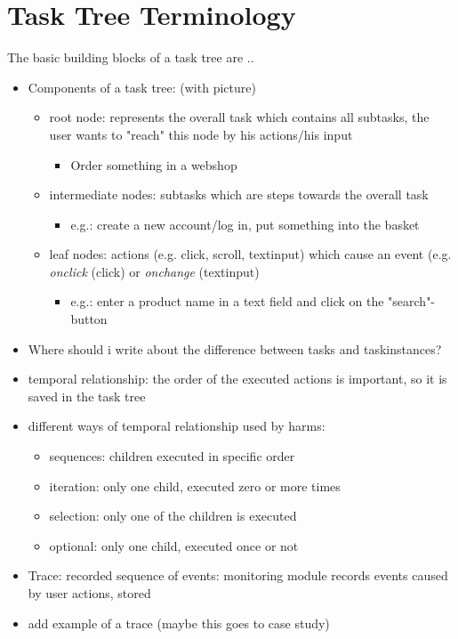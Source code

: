 \section{Task Tree Terminology}
\label{sec:foundationtasktreeterminology}
	The basic building blocks of a task tree are ..
\begin{itemize} 
	
	\item Components of a task tree: (with picture)
	\begin{itemize}
		\item root node: represents the overall task which contains all subtasks, the user wants to "reach" this node by his actions/his input
		\begin{itemize}
    			\item Order something in a webshop
		\end{itemize}
		\item intermediate nodes: subtasks which are steps towards the overall task
		\begin{itemize}
			\item e.g.: create a new account/log in, put something into the basket
		\end{itemize}
		\item leaf nodes: actions (e.g. click, scroll, textinput) which cause an event (e.g. \textit{onclick} (click) or \textit{onchange} (textinput)
		\begin{itemize}
			\item e.g.: enter a product name in a text field and click on the "search"-button
		\end{itemize}
	\end{itemize}
	\item Where should i write about the difference between tasks and taskinstances? 	
	\item temporal relationship: the order of the executed actions is important, so it is saved in the task tree
	\item different ways of temporal relationship used by harms: 
	\begin{itemize}
		\item sequences: children executed in specific order
		\item iteration: only one child, executed zero or more times
		\item selection: only one of the children is executed
		\item optional:  only one child, executed once or not
	\end{itemize}	
	\item Trace: recorded sequence of events: monitoring module records events caused by user actions, stored 
	\item add example of a trace (maybe this goes to case study)
\end{itemize}

